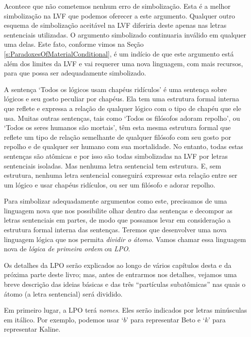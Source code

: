Acontece que não cometemos nenhum erro de simbolização.
Esta é a melhor simbolização na LVF que podemos oferecer a este argumento.
Qualquer outro esquema de simbolização aceitável na LVF diferiria deste apenas nas letras sentenciais utilizadas.
O argumento simbolizado continuaria inválido em qualquer uma delas.
Este fato, conforme vimos na Seção \ref{s:ParadoxesOfMaterialConditional}, é um indício de que este argumento está além dos limites da LVF e vai requerer uma nova linguagem, com mais recursos, para que possa ser adequadamente simbolizado.

A sentença `Todos os lógicos usam chapéus ridículos' é uma sentença sobre lógicos e seu gosto peculiar por chapéus.
Ela tem uma estrutura formal interna que reflete e expressa a relação de qualquer lógico com o tipo de chapéu que ele usa.
Muitas outras sentenças, tais como `Todos os filósofos adoram repolho', ou  `Todos os seres humanos são mortais', têm esta mesma estrutura formal que reflete um tipo de relação semelhante de qualquer filósofo com seu gosto por repolho e de qualquer ser humano com sua mortalidade. 
No entanto, todas estas sentenças são atômicas e por isso são todas simbolizadas na LVF por letras sentenciais isoladas.
Mas nenhuma letra sentencial tem estrutura.
E, sem estrutura, nenhuma letra sentencial conseguirá expressar esta relação entre ser um lógico e usar chapéus ridículos, ou ser um filósofo e adorar repolho.

Para simbolizar adequadamente argumentos como este, precisamos de uma linguagem nova que nos possibilite olhar dentro das sentenças e decompor as letras sentenciais em partes, de modo que possamos levar em consideração a estrutura formal interna das sentenças.
Teremos que desenvolver uma nova linguagem lógica que nos permita \emph{dividir o átomo}.
Vamos chamar essa linguagem nova de \emph{lógica de primeira ordem} ou \emph{LPO}.

Os detalhes da LPO serão explicados ao longo de vários capítulos desta e da próxima parte deste livro; mas, antes de entrarmos nos detalhes, vejamos uma breve descrição das ideias básicas e das três ``partículas subatômicas'' nas quais  o átomo (a letra sentencial) será dividido.

Em primeiro lugar, a LPO terá \emph{nomes}.
Eles serão indicados por letras minúsculas em itálico.
Por exemplo, podemos usar `$b$' para representar Beto e `$k$' para representar Kaline.

